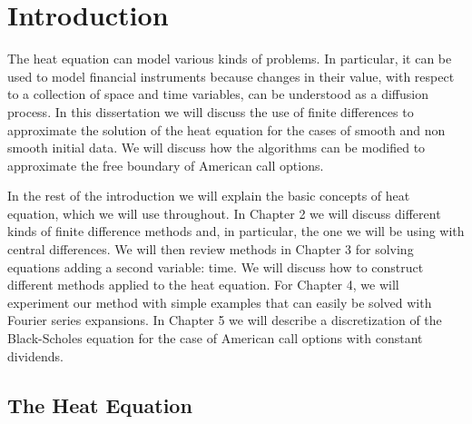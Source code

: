 \documentclass[00main.tex]{subfiles}
\begin{document}
\chapter{Introduction}




The heat equation can model various kinds of problems. In particular, it can be used to model financial instruments because changes in their value, with respect to a collection of space and time variables, can be understood as a diffusion process. In this dissertation we will discuss the use of finite differences to approximate the solution of the heat equation for the cases of smooth and non smooth initial data. We will discuss how the algorithms can be modified to approximate the free boundary of American call options.


In the rest of the introduction we will explain the basic concepts of heat equation, which we will use throughout. In Chapter 2 we will discuss different kinds of finite difference methods and, in particular, the one we will be using with central differences. We will then review methods in Chapter 3 for solving equations adding a second variable: time. We will discuss how to construct different methods applied to the heat equation. For Chapter 4, we will experiment our method with simple examples that can easily be solved with Fourier series expansions. In Chapter 5 we will describe a discretization of the Black-Scholes equation for the case of American call options with constant dividends.





\section{The Heat Equation}
\end{document}
